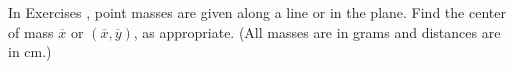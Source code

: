 {\noindent In Exercises}
{, point masses are given along a line or in the plane. Find the center of mass $\overline{x}$ or $(\overline{x},\overline{y})$, as appropriate. (All masses are in grams and distances are in cm.)}
